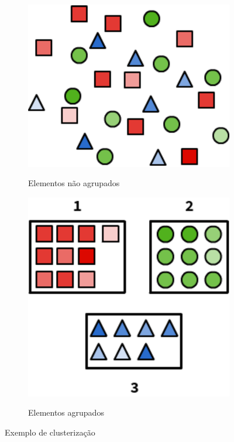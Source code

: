 \begin{figure}[h]
  \centering
  \begin{subfigure}{.5\textwidth}
    \centering
    \includegraphics[scale=0.8]{figuras/ungroup-elements.eps}
    \label{fig:ungroup-elements}
    \caption{Elementos não agrupados}
  \end{subfigure}%
  \begin{subfigure}{.5\textwidth}
    \centering
    \includegraphics[scale=0.8]{figuras/group-elements.eps}
    \label{fig:group-elements}
    \caption{Elementos agrupados}
  \end{subfigure}
  \caption{Exemplo de clusterização}
\end{figure}

